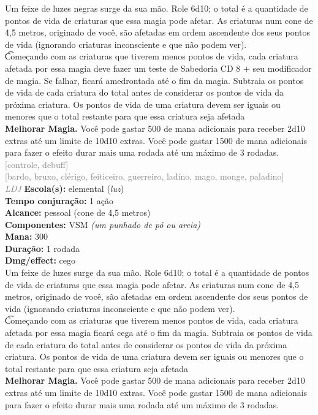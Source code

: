 \documentclass{RPG_Adventure}[2021/10/20]
\begin{document}
{\normalsize Um feixe de luzes negras surge da sua mão. Role 6d10; o total é a quantidade de pontos de vida de criaturas que essa magia pode afetar. As criaturas num cone de 4,5 metros, originado de você, são afetadas em ordem ascendente dos seus pontos de vida (ignorando criaturas inconsciente e que não podem ver).\\\t Começando com as criaturas que tiverem menos pontos de vida, cada criatura afetada por essa magia deve fazer um teste de Sabedoria CD 8 + seu modificador de magia. Se falhar, ficará amedrontada até o fim da magia. Subtraia os pontos de vida de cada criatura do total antes de considerar os pontos de vida da próxima criatura. Os pontos de vida de uma criatura devem ser iguais ou menores que o total restante para que essa criatura seja afetada\\\t \textbf{Melhorar Magia.} Você pode gastar 500 de mana adicionais para receber 2d10 extras até um limite de 10d10 extras. Você pode gastar 1500 de mana adicionais para fazer o efeito durar mais uma rodada até um máximo de 3 rodadas.\\}
{\scriptsize \textcolor{gray}{[controle, debuff]\\}}
{\scriptsize \textcolor{gray}{[bardo, bruxo, clérigo, feiticeiro, guerreiro, ladino, mago, monge, paladino]\\}}
{\tiny \textcolor{gray}{\textit{LDJ}}}
{\small \t \textbf{Escola(s):} elemental (\textit{luz})\\\t \textbf{Tempo conjuração:} 1 ação\\\t \textbf{Alcance:} pessoal (cone de 4,5 metros)\\\t \textbf{Componentes:} VSM \textit{(um punhado de pó ou areia)}\\\t \textbf{Mana:} 300\\\t \textbf{Duração:} 1 rodada\\\t \textbf{Dmg/effect:} cego\\}
{\normalsize Um feixe de luzes surge da sua mão. Role 6d10; o total é a quantidade de pontos de vida de criaturas que essa magia pode afetar. As criaturas num cone de 4,5 metros, originado de você, são afetadas em ordem ascendente dos seus pontos de vida (ignorando criaturas inconsciente e que não podem ver).\\\t Começando com as criaturas que tiverem menos pontos de vida, cada criatura afetada por essa magia ficará cega até o fim da magia. Subtraia os pontos de vida de cada criatura do total antes de considerar os pontos de vida da próxima criatura. Os pontos de vida de uma criatura devem ser iguais ou menores que o total restante para que essa criatura seja afetada\\\t \textbf{Melhorar Magia.} Você pode gastar 500 de mana adicionais para receber 2d10 extras até um limite de 10d10 extras. Você pode gastar 1500 de mana adicionais para fazer o efeito durar mais uma rodada até um máximo de 3 rodadas.\\}
\end{document}
